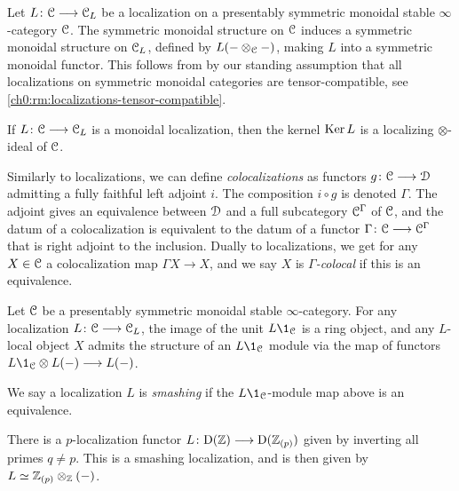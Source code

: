 \begin{remark}
    \label{ch0:rm:monoidal-localization}
    Let $L\colon \EuScript{C}\longrightarrow \EuScript{C}_L$ be a localization on a presentably symmetric monoidal stable $\infty$-category $\EuScript{C}$. The symmetric monoidal structure on $\EuScript{C}$ induces a symmetric monoidal structure on $\EuScript{C}_L$, defined by $L(-\otimes_{\EuScript{C}} -)$, making $L$ into a symmetric monoidal functor. This follows from \cite[2.2.1.9]{Lurie_HA} by our standing assumption that all localizations on symmetric monoidal categories are tensor-compatible, see \cref{ch0:rm:localizations-tensor-compatible}. 
\end{remark}

\begin{remark}
    If $L\colon \EuScript{C}\longrightarrow \EuScript{C}_L$ is a monoidal localization, then the kernel $\operatorname{Ker} L$ is a localizing $\otimes$-ideal of $\EuScript{C}$. 
\end{remark}

\begin{remark}
    Similarly to localizations, we can define \emph{colocalizations} as functors $g\colon \EuScript{C}\longrightarrow \EuScript{D}$ admitting a fully faithful left adjoint $i$. The composition $i\circ g$ is denoted $\Gamma$. The adjoint gives an equivalence between $\EuScript{D}$ and a full subcategory $\EuScript{C}^\Gamma$ of $\EuScript{C}$, and the datum of a colocalization is equivalent to the datum of a functor $\Gamma\colon \EuScript{C}\longrightarrow \EuScript{C}^\Gamma$ that is right adjoint to the inclusion. Dually to localizations, we get for any $X\in \EuScript{C}$ a colocalization map $\Gamma X\to X$, and we say $X$ is \emph{$\Gamma$-colocal} if this is an equivalence. 
\end{remark}

Let $\EuScript{C}$ be a presentably symmetric monoidal stable $\infty$-category. For any localization $L\colon \EuScript{C}\longrightarrow \EuScript{C}_L$, the image of the unit $L\1_\C$ is a ring object, and any $L$-local object $X$ admits the structure of an $L\1_\C$ module via the map of functors $L\1_\C \otimes L(-)\longrightarrow L(-)$. 

\begin{definition}
    \label{ch0:def:smashing-localization}
    We say a localization $L$ is \emph{smashing} if the $L\1_\C$-module map above is an equivalence. 
\end{definition}

\begin{example}
    \label{ch0:ex:p-localization-ab-smashing}
    There is a $p$-localization functor $L\colon\mathrm{D}(\mathbb{Z})\longrightarrow \mathrm{D}(\mathbb{Z}_{(p)})$ given by inverting all primes $q\neq p$. This is a smashing localization, and is then given by $L \simeq \mathbb{Z}_{(p)}\otimes_{\mathbb{Z}} (-)$. 
\end{example}

